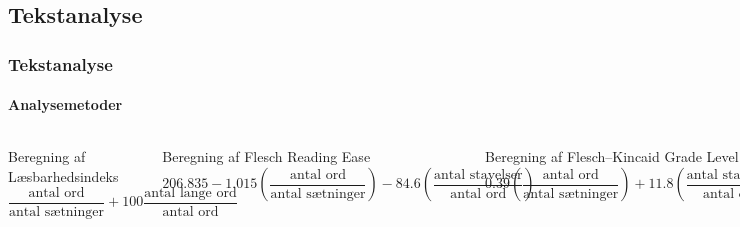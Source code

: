 \documentclass{beamer}
\begin{document}
\subsection{Tekstanalyse}
\begin{frame}
  \frametitle{Tekstanalyse}
  \framesubtitle{Analysemetoder}

  \begin{columns}[t]

    \begin{block}{Beregning af Læsbarhedsindeks}
      \begin{displaymath}
        \frac{\text{antal ord}}{\text{antal sætninger}} +
        100\frac{\text{antal lange ord}}{\text{antal ord}}
      \end{displaymath}
    \end{block}


    \begin{block}{Beregning af Flesch Reading Ease}
      \begin{displaymath}
        206.835 - 1.015 \left ( \frac{\text{antal ord}}{\text{antal
              sætninger}} \right ) - 84.6 \left (
          \frac{\text{antal stavelser}}{\text{antal ord}} \right )
      \end{displaymath}
    \end{block}

    \begin{block}{Beregning af Flesch--Kincaid Grade Level}
      \begin{displaymath}
        0.39 \left ( \frac{\text{antal ord}}{\text{antal sætninger}} \right
        ) + 11.8 \left ( \frac{\text{antal stavelser}}{\text{antal ord}}
        \right ) - 15.59
      \end{displaymath}
    \end{block}

    \end{columns}

\end{frame}
\end{document}
